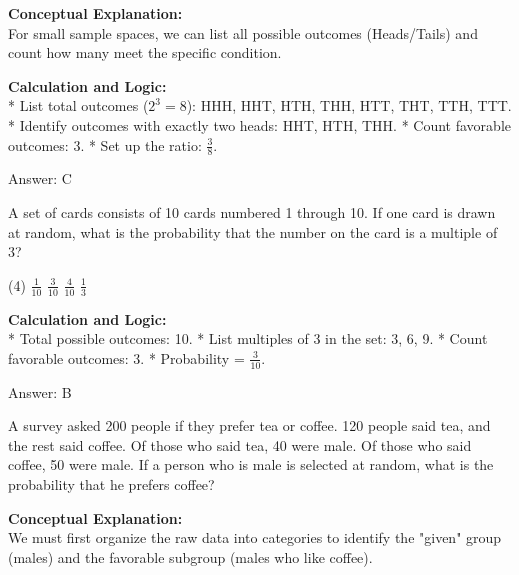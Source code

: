 \documentclass[11pt,paper=a4,answers]{exam}
\begin{document}
\begin{questions}
\begin{solution}
\textbf{Conceptual Explanation:} \\
For small sample spaces, we can list all possible outcomes (Heads/Tails) and count how many meet the specific condition.

\vspace{30pt}

\textbf{Calculation and Logic:} \\
* List total outcomes ($2^3 = 8$): HHH, HHT, HTH, THH, HTT, THT, TTH, TTT.
* Identify outcomes with exactly two heads: HHT, HTH, THH.
* Count favorable outcomes: 3.
* Set up the ratio: $\frac{3}{8}$.

\vspace{30pt}

Answer: \colorbox{yellow!100}{C}
\end{solution}

\vspace{60pt}

\question
A set of cards consists of 10 cards numbered 1 through 10. If one card is drawn at random, what is the probability that the number on the card is a multiple of 3?
\begin{tasks}(4)
    \task $\frac{1}{10}$
    \task $\frac{3}{10}$
    \task $\frac{4}{10}$
    \task $\frac{1}{3}$
\end{tasks}

\begin{solution}
\textbf{Calculation and Logic:} \\
* Total possible outcomes: 10.
* List multiples of 3 in the set: 3, 6, 9.
* Count favorable outcomes: 3.
* Probability = $\frac{3}{10}$.

\vspace{30pt}

Answer: \colorbox{yellow!100}{B}
\end{solution}

\vspace{60pt}

\question
A survey asked 200 people if they prefer tea or coffee. 120 people said tea, and the rest said coffee. Of those who said tea, 40 were male. Of those who said coffee, 50 were male. If a person who is male is selected at random, what is the probability that he prefers coffee?

\begin{solution}
\textbf{Conceptual Explanation:} \\
We must first organize the raw data into categories to identify the "given" group (males) and the favorable subgroup (males who like coffee).


\end{solution}
\end{questions}
\end{document}
